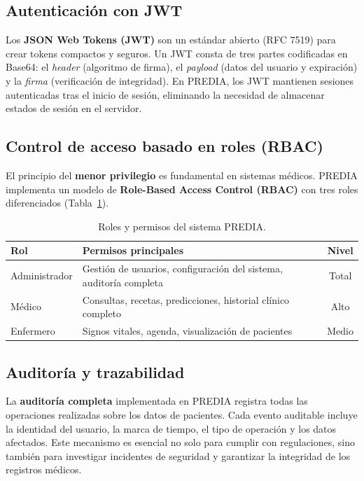 \documentclass[12pt, letterpaper, twoside]{report}
\newcommand{\thead}[1]{\textbf{\sffamily #1}}
\newcommand{\trow}{}
\begin{document}
\subsection{Autenticación con JWT}

Los \textbf{JSON Web Tokens (JWT)} son un estándar abierto (RFC 7519) para crear tokens compactos y seguros. Un JWT consta de tres partes codificadas en Base64: el \textit{header} (algoritmo de firma), el \textit{payload} (datos del usuario y expiración) y la \textit{firma} (verificación de integridad). En PREDIA, los JWT mantienen sesiones autenticadas tras el inicio de sesión, eliminando la necesidad de almacenar estados de sesión en el servidor.

\subsection{Control de acceso basado en roles (RBAC)}

El principio del \textbf{menor privilegio} es fundamental en sistemas médicos. PREDIA implementa un modelo de \textbf{Role-Based Access Control (RBAC)} con tres roles diferenciados (Tabla~\ref{tab:rbac}).

\begin{table}[H]
  \centering
  \caption{Roles y permisos del sistema PREDIA.}
  \label{tab:rbac}
  \begin{tabularx}{\linewidth}{l X c}
    \toprule
    \thead{Rol} & \thead{Permisos principales} & \thead{Nivel} \\
    \midrule
    \trow Administrador & Gestión de usuarios, configuración del sistema, auditoría completa & Total \\
    Médico & Consultas, recetas, predicciones, historial clínico completo & Alto \\
    \trow Enfermero & Signos vitales, agenda, visualización de pacientes & Medio \\
    \bottomrule
  \end{tabularx}
\end{table}

\subsection{Auditoría y trazabilidad}

La \textbf{auditoría completa} implementada en PREDIA registra todas las operaciones realizadas sobre los datos de pacientes. Cada evento auditable incluye la identidad del usuario, la marca de tiempo, el tipo de operación y los datos afectados. Este mecanismo es esencial no solo para cumplir con regulaciones, sino también para investigar incidentes de seguridad y garantizar la integridad de los registros médicos.
\end{document}
